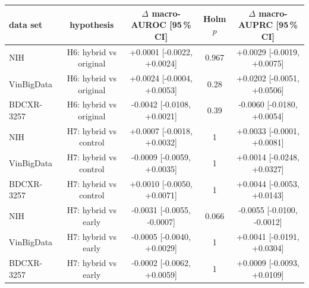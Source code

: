 \begin{tabular}{lcccc}
\toprule
data set & hypothesis & $\Delta$ macro-AUROC [95\,\% CI] & Holm $p$ & $\Delta$ macro-AUPRC [95\,\% CI] \\
\midrule
NIH & H6: hybrid vs original & +0.0001 [-0.0022, +0.0024] & 0.967 & +0.0029 [-0.0019, +0.0075] \\
VinBigData & H6: hybrid vs original & +0.0024 [-0.0004, +0.0053] & 0.28 & +0.0202 [-0.0051, +0.0506] \\
BDCXR-3257 & H6: hybrid vs original & -0.0042 [-0.0108, +0.0021] & 0.39 & -0.0060 [-0.0180, +0.0054] \\
NIH & H7: hybrid vs control & +0.0007 [-0.0018, +0.0032] & 1 & +0.0033 [-0.0001, +0.0081] \\
VinBigData & H7: hybrid vs control & -0.0009 [-0.0059, +0.0035] & 1 & +0.0014 [-0.0248, +0.0327] \\
BDCXR-3257 & H7: hybrid vs control & +0.0010 [-0.0050, +0.0071] & 1 & +0.0044 [-0.0053, +0.0143] \\
NIH & H7: hybrid vs early & -0.0031 [-0.0055, -0.0007] & 0.066 & -0.0055 [-0.0100, -0.0012] \\
VinBigData & H7: hybrid vs early & -0.0005 [-0.0040, +0.0029] & 1 & +0.0041 [-0.0191, +0.0304] \\
BDCXR-3257 & H7: hybrid vs early & -0.0002 [-0.0062, +0.0059] & 1 & +0.0009 [-0.0093, +0.0109] \\
\bottomrule
\end{tabular}
